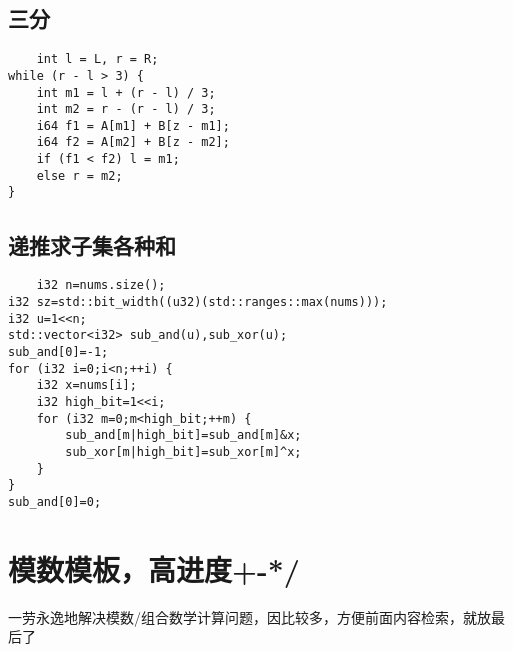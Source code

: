 \documentclass[UTF8]{ctexart}
\begin{document}
\subsection{三分}
\begin{lstlisting}
    int l = L, r = R;
while (r - l > 3) {
    int m1 = l + (r - l) / 3;
    int m2 = r - (r - l) / 3;
    i64 f1 = A[m1] + B[z - m1];
    i64 f2 = A[m2] + B[z - m2];
    if (f1 < f2) l = m1;
    else r = m2;
}
\end{lstlisting}
\subsection{递推求子集各种和}
\begin{lstlisting}
    i32 n=nums.size();
i32 sz=std::bit_width((u32)(std::ranges::max(nums)));
i32 u=1<<n;
std::vector<i32> sub_and(u),sub_xor(u);
sub_and[0]=-1;
for (i32 i=0;i<n;++i) {
    i32 x=nums[i];
    i32 high_bit=1<<i;
    for (i32 m=0;m<high_bit;++m) {
        sub_and[m|high_bit]=sub_and[m]&x;
        sub_xor[m|high_bit]=sub_xor[m]^x;
    }
}
sub_and[0]=0;
\end{lstlisting}
\section{模数模板，高进度+-*/}
一劳永逸地解决模数/组合数学计算问题，因比较多，方便前面内容检索，就放最后了
\end{document}
